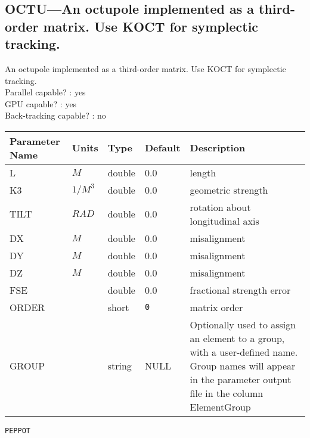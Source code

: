 \subsection{OCTU---An octupole implemented as a third-order matrix. Use KOCT for symplectic tracking.}
An octupole implemented as a third-order matrix. Use KOCT for symplectic tracking.
\\
Parallel capable? : yes\\
GPU capable? : yes\\
Back-tracking capable? : no\\
\begin{tabular}{|l|l|l|l|p{\descwidth}|} \hline
Parameter Name & Units & Type & Default & Description \\ \hline 
L & $M$ & double &  0.0 & length  \\ \hline 
K3 & $1/M^{3}$ & double &  0.0 & geometric strength  \\ \hline 
TILT & $RAD$ & double &  0.0 & rotation about longitudinal axis  \\ \hline 
DX & $M$ & double &  0.0 & misalignment  \\ \hline 
DY & $M$ & double &  0.0 & misalignment  \\ \hline 
DZ & $M$ & double &  0.0 & misalignment  \\ \hline 
FSE &  & double &  0.0 & fractional strength error  \\ \hline 
ORDER &  & short &  \verb|0| & matrix order  \\ \hline 
GROUP &  & string & NULL & Optionally used to assign an element to a group, with a user-defined name.  Group names will appear in the parameter output file in the column ElementGroup  \\ \hline 
\end{tabular}

\newpage
\begin{center}{\Large\verb|PEPPOT|}\end{center}
